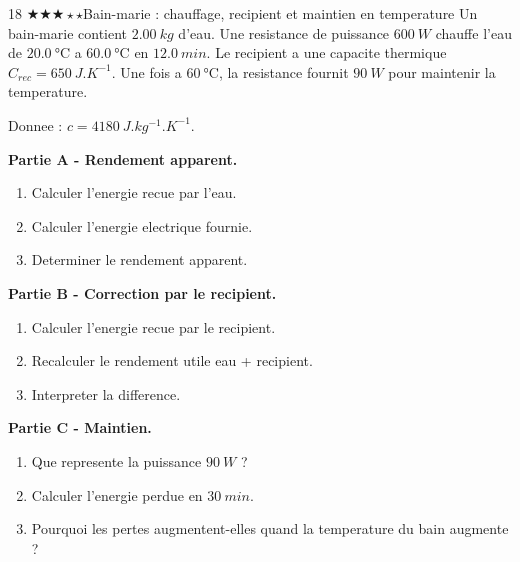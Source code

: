 \documentclass[11pt,a4paper]{article}
\newcommand{\diffthree}{\(\bigstar\bigstar\bigstar\star\star\)}
\begin{document}
\begin{probleme}{18 \diffthree}{Bain-marie : chauffage, recipient et maintien en temperature}
Un bain-marie contient \(\SI{2.00}{kg}\) d'eau. Une resistance de puissance \(\SI{600}{W}\) chauffe l'eau de \(\SI{20.0}{\celsius}\) a \(\SI{60.0}{\celsius}\) en \(\SI{12.0}{min}\). Le recipient a une capacite thermique \(C_{rec}=\SI{650}{J.K^{-1}}\). Une fois a \(\SI{60}{\celsius}\), la resistance fournit \(\SI{90}{W}\) pour maintenir la temperature.

Donnee : \(c=\SI{4180}{J.kg^{-1}.K^{-1}}\).

\textbf{Partie A - Rendement apparent.}
\begin{enumerate}
\item Calculer l'energie recue par l'eau.
\item Calculer l'energie electrique fournie.
\item Determiner le rendement apparent.
\end{enumerate}

\textbf{Partie B - Correction par le recipient.}
\begin{enumerate}[resume]
\item Calculer l'energie recue par le recipient.
\item Recalculer le rendement utile eau + recipient.
\item Interpreter la difference.
\end{enumerate}

\textbf{Partie C - Maintien.}
\begin{enumerate}[resume]
\item Que represente la puissance \(\SI{90}{W}\) ?
\item Calculer l'energie perdue en \(\SI{30}{min}\).
\item Pourquoi les pertes augmentent-elles quand la temperature du bain augmente ?
\end{enumerate}
\end{probleme}
\end{document}
